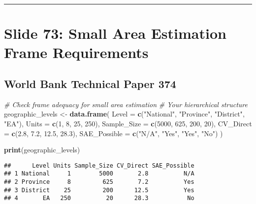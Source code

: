 \documentclass[
]{article}
\newenvironment{Shaded}{\begin{snugshade}}{\end{snugshade}}
\newcommand{\AttributeTok}[1]{\textcolor[rgb]{0.13,0.29,0.53}{#1}}
\newcommand{\CommentTok}[1]{\textcolor[rgb]{0.56,0.35,0.01}{\textit{#1}}}
\newcommand{\DecValTok}[1]{\textcolor[rgb]{0.00,0.00,0.81}{#1}}
\newcommand{\FloatTok}[1]{\textcolor[rgb]{0.00,0.00,0.81}{#1}}
\newcommand{\FunctionTok}[1]{\textcolor[rgb]{0.13,0.29,0.53}{\textbf{#1}}}
\newcommand{\NormalTok}[1]{#1}
\newcommand{\OtherTok}[1]{\textcolor[rgb]{0.56,0.35,0.01}{#1}}
\newcommand{\StringTok}[1]{\textcolor[rgb]{0.31,0.60,0.02}{#1}}
\begin{document}
\begin{center}\rule{0.5\linewidth}{0.5pt}\end{center}

\section{Slide 73: Small Area Estimation Frame
Requirements}\label{slide-73-small-area-estimation-frame-requirements}

\subsection{World Bank Technical Paper
374}\label{world-bank-technical-paper-374}

\begin{Shaded}
\begin{Highlighting}[]
\CommentTok{\# Check frame adequacy for small area estimation}
\CommentTok{\# Your hierarchical structure}
\NormalTok{geographic\_levels }\OtherTok{\textless{}{-}} \FunctionTok{data.frame}\NormalTok{(}
  \AttributeTok{Level =} \FunctionTok{c}\NormalTok{(}\StringTok{"National"}\NormalTok{, }\StringTok{"Province"}\NormalTok{, }\StringTok{"District"}\NormalTok{, }\StringTok{"EA"}\NormalTok{),}
  \AttributeTok{Units =} \FunctionTok{c}\NormalTok{(}\DecValTok{1}\NormalTok{, }\DecValTok{8}\NormalTok{, }\DecValTok{25}\NormalTok{, }\DecValTok{250}\NormalTok{),}
  \AttributeTok{Sample\_Size =} \FunctionTok{c}\NormalTok{(}\DecValTok{5000}\NormalTok{, }\DecValTok{625}\NormalTok{, }\DecValTok{200}\NormalTok{, }\DecValTok{20}\NormalTok{),}
  \AttributeTok{CV\_Direct =} \FunctionTok{c}\NormalTok{(}\FloatTok{2.8}\NormalTok{, }\FloatTok{7.2}\NormalTok{, }\FloatTok{12.5}\NormalTok{, }\FloatTok{28.3}\NormalTok{),}
  \AttributeTok{SAE\_Possible =} \FunctionTok{c}\NormalTok{(}\StringTok{"N/A"}\NormalTok{, }\StringTok{"Yes"}\NormalTok{, }\StringTok{"Yes"}\NormalTok{, }\StringTok{"No"}\NormalTok{)}
\NormalTok{)}

\FunctionTok{print}\NormalTok{(geographic\_levels)}
\end{Highlighting}
\end{Shaded}

\begin{verbatim}
##      Level Units Sample_Size CV_Direct SAE_Possible
## 1 National     1        5000       2.8          N/A
## 2 Province     8         625       7.2          Yes
## 3 District    25         200      12.5          Yes
## 4       EA   250          20      28.3           No
\end{verbatim}
\end{document}
